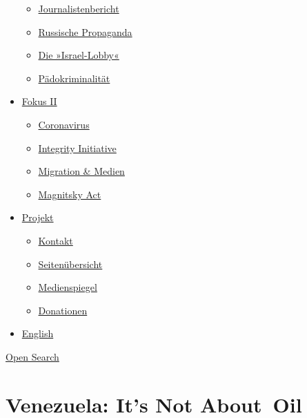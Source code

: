 \begin{itemize}
  \begin{itemize}
  \tightlist
  \item
    \href{https://swprs.org/bericht-eines-journalisten/}{Journalistenbericht}
  \item
    \href{https://swprs.org/russische-propaganda/}{Russische Propaganda}
  \item
    \href{https://swprs.org/die-israel-lobby-fakten-und-mythen/}{Die
    »Israel-Lobby«}
  \item
    \href{https://swprs.org/geopolitik-und-paedokriminalitaet/}{Pädokriminalität}
  \end{itemize}
\item
  \href{https://swprs.org/migration-und-medien/}{Fokus II}

  \begin{itemize}
  \tightlist
  \item
    \href{https://swprs.org/covid-19-hinweis-ii/}{Coronavirus}
  \item
    \href{https://swprs.org/die-integrity-initiative/}{Integrity
    Initiative}
  \item
    \href{https://swprs.org/migration-und-medien/}{Migration \& Medien}
  \item
    \href{https://swprs.org/der-fall-magnitsky/}{Magnitsky Act}
  \end{itemize}
\item
  \href{https://swprs.org/kontakt/}{Projekt}

  \begin{itemize}
  \tightlist
  \item
    \href{https://swprs.org/kontakt/}{Kontakt}
  \item
    \href{https://swprs.org/uebersicht/}{Seitenübersicht}
  \item
    \href{https://swprs.org/medienspiegel/}{Medienspiegel}
  \item
    \href{https://swprs.org/donationen/}{Donationen}
  \end{itemize}
\item
  \href{https://swprs.org/contact/}{English}
\end{itemize}

\protect\hyperlink{}{Open Search}

\hypertarget{venezuela-its-not-about-oil}{%
\section{Venezuela: It's Not
About~Oil}\label{venezuela-its-not-about-oil}}

